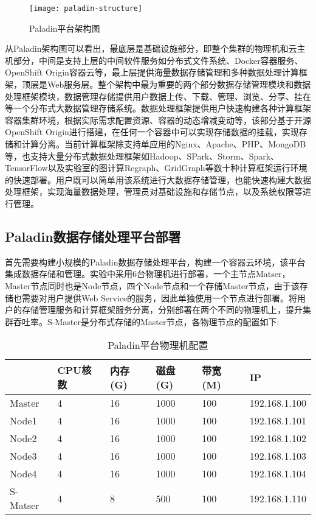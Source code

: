 \begin{figure}[H] %
	\centering
	\texttt{[image: paladin-structure]}
	\caption{Paladin平台架构图}
\end{figure}

从Paladin架构图可以看出，最底层是基础设施部分，即整个集群的物理机和云主机部分，中间是支持上层的中间软件服务如分布式文件系统、Docker容器服务、OpenShift Origin容器云等，最上层提供海量数据存储管理和多种数据处理计算框架，顶层是Web服务层。整个架构中最为重要的两个部分数据存储管理模块和数据处理框架模块，数据管理存储提供用户数据上传、下载、管理、浏览、分享、挂在等一个分布式大数据管理存储系统。数据处理框架提供用户快速构建各种计算框架容器集群环境，根据实际需求配置资源、容器的动态增减变动等，该部分基于开源OpenShift Origin进行搭建，在任何一个容器中可以实现存储数据的挂载，实现存储和计算分离。当前计算框架除支持单应用的Nginx、Apache、PHP、MongoDB等，也支持大量分布式数据处理框架如Hadoop、SPark、Storm、Spark、TensorFlow以及实验室的图计算Regraph、GridGraph等数十种计算框架运行环境的快速部署。用户既可以简单用该系统进行大数据存储管理，也能快速构建大数据处理框架，实现海量数据处理，管理员对基础设施和存储节点，以及系统权限等进行管理。

\subsection{Paladin数据存储处理平台部署}
首先需要构建小规模的Paladin数据存储处理平台，构建一个容器云环境，该平台集成数据存储和管理。实验中采用6台物理机进行部署，一个主节点Matser，Master节点同时也是Node节点，四个Node节点和一个存储Master节点，由于该存储也需要对用户提供Web Service的服务，因此单独使用一个节点进行部署。将用户的存储管理服务和计算框架服务分离，分别部署在两个不同的物理机上，提升集群吞吐率。S-Master是分布式存储的Master节点，各物理节点的配置如下:
\begin{table}[H]
	\centering\dawu[1.3]
	\caption{Paladin平台物理机配置}
	\begin{tabular}{|p{1.8cm}<{\centering}|p{1.5cm}<{\centering}|p{1.5cm}<{\centering}|p{1.5cm}<{\centering}|p{1.5cm}<{\centering}|p{3cm}<{\centering}|} \hline
		\diagbox[innerwidth=1.8cm]{节点}{资源} & CPU核数 & 内存(G) & 磁盘(G) & 带宽(M) & IP \\ \hline
		Master & 4 & 16 & 1000 & 100 & 192.168.1.100  \\ \hline
		Node1 & 4 & 16 & 1000 & 100  & 192.168.1.101 \\ \hline
		Node2 & 4 & 16 & 1000 & 100  & 192.168.1.102 \\ \hline
		Node3 & 4 & 16 & 1000 & 100  & 192.168.1.103 \\ \hline
		Node4 & 4 & 16 & 1000 & 100  & 192.168.1.104 \\ \hline
		S-Matser & 4 & 8 & 500 & 100  & 192.168.1.110 \\ \hline
	\end{tabular}
\end{table}

